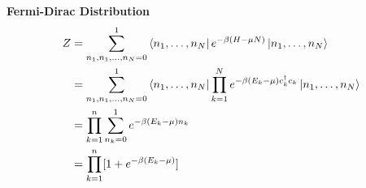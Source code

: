 \documentclass[prb,12pt]{revtex4-2}
\theoremstyle{definition}
\theoremstyle{definition}
\theoremstyle{definition}
\begin{document}
\textbf{Fermi-Dirac Distribution}
\begin{align*}
	Z &= \sum_{n_1, n_1, \dots, n_N = 0}^1 \bra{n_1, \dots, n_N}e^{-\beta(H - \mu N)}\ket{n_1, \dots, n_N}\\
	&= \sum_{n_1, n_1, \dots, n_N = 0}^1 \bra{n_1, \dots, n_N}\prod_{k=1}^N e^{-\beta(E_k - \mu)c_k^\dagger c_k}\ket{n_1, \dots, n_N}\\
	&= \prod_{k=1}^n \sum_{n_k=0}^1 e^{-\beta(E_k - \mu)n_k}\\
	&= \prod_{k=1}^n [1 + e^{-\beta(E_k - \mu)}]
\end{align*}
\end{document}
